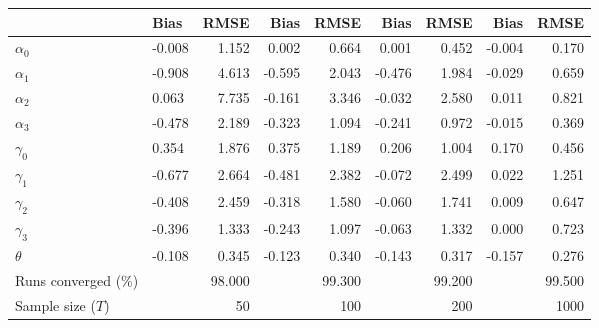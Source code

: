 
\begin{tabular}[t]{llrrrrrrr}
\toprule
  & Bias & RMSE & Bias & RMSE & Bias & RMSE & Bias & RMSE\\
\midrule
$\alpha_{0}$ & -0.008 & 1.152 & 0.002 & 0.664 & 0.001 & 0.452 & -0.004 & 0.170\\
$\alpha_{1}$ & -0.908 & 4.613 & -0.595 & 2.043 & -0.476 & 1.984 & -0.029 & 0.659\\
$\alpha_{2}$ & 0.063 & 7.735 & -0.161 & 3.346 & -0.032 & 2.580 & 0.011 & 0.821\\
$\alpha_{3}$ & -0.478 & 2.189 & -0.323 & 1.094 & -0.241 & 0.972 & -0.015 & 0.369\\
$\gamma_{0}$ & 0.354 & 1.876 & 0.375 & 1.189 & 0.206 & 1.004 & 0.170 & 0.456\\
$\gamma_{1}$ & -0.677 & 2.664 & -0.481 & 2.382 & -0.072 & 2.499 & 0.022 & 1.251\\
$\gamma_{2}$ & -0.408 & 2.459 & -0.318 & 1.580 & -0.060 & 1.741 & 0.009 & 0.647\\
$\gamma_{3}$ & -0.396 & 1.333 & -0.243 & 1.097 & -0.063 & 1.332 & 0.000 & 0.723\\
$\theta$ & -0.108 & 0.345 & -0.123 & 0.340 & -0.143 & 0.317 & -0.157 & 0.276\\
Runs converged (\%) &  & 98.000 &  & 99.300 &  & 99.200 &  & 99.500\\
Sample size ($T$) &  & 50 &  & 100 &  & 200 &  & 1000\\
\bottomrule
\end{tabular}
